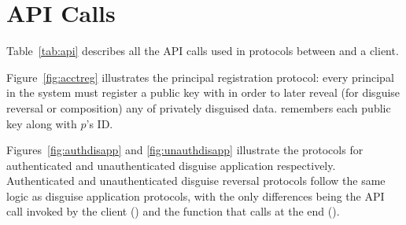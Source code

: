 \section{\sys API Calls}
Table~\ref{tab:api} describes all the API calls used in protocols between \sys and a client.

Figure~\ref{fig:acctreg} illustrates the principal registration protocol: every principal in the
system must register a public key with \sys in order to later reveal (for disguise reversal or
composition) any of privately disguised data. \sys remembers each public key  along with
$p$'s ID.

Figures~\ref{fig:authdisapp} and \ref{fig:unauthdisapp} illustrate the protocols for authenticated
and unauthenticated disguise application respectively. Authenticated and unauthenticated disguise
reversal protocols follow the same logic as disguise application protocols, with the only
differences being the API call invoked by the client () and the
function that \sys calls at the end ().
